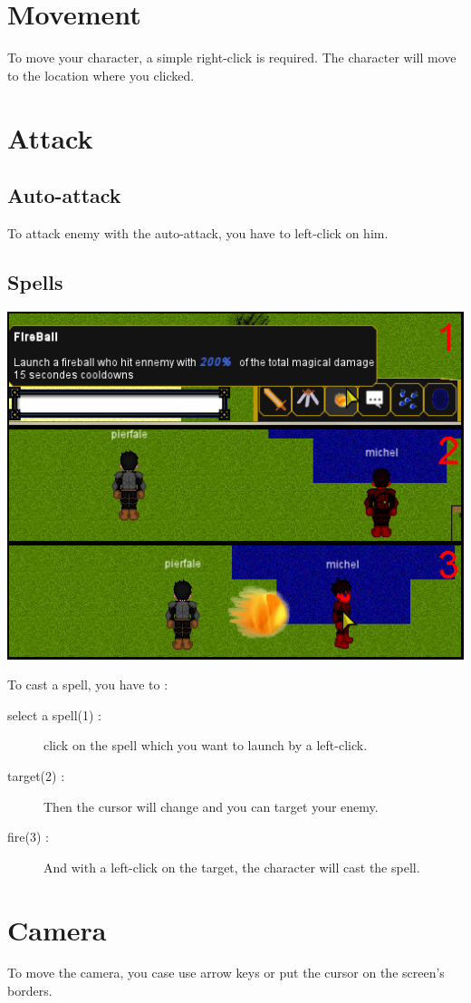 \documentclass{scrreprt}
\begin{document}
		  \section{Movement}
		To move your character, a simple right-click is required. The character will move to the location where you clicked.
		  \section{Attack}
		  \subsection{Auto-attack}
		To attack enemy with the auto-attack, you have to left-click on him.
		  \subsection{Spells}
		\begin{center}
		\includegraphics[scale=0.4]{cast_spell.png}
		\end{center}
		To cast a spell, you have to :
 		\begin{description}
  		\item[select a spell(1) :]{click on the spell which you want to launch by a left-click.} 
		\item[target(2) :]{Then the cursor will change and you can target your enemy.}
		\item[fire(3) :]{And with a left-click on the target, the character will cast the spell.}
		 \end{description}
		  \section{Camera}
		To move the camera, you case use arrow keys or put the cursor on the screen's borders.
\end{document}
